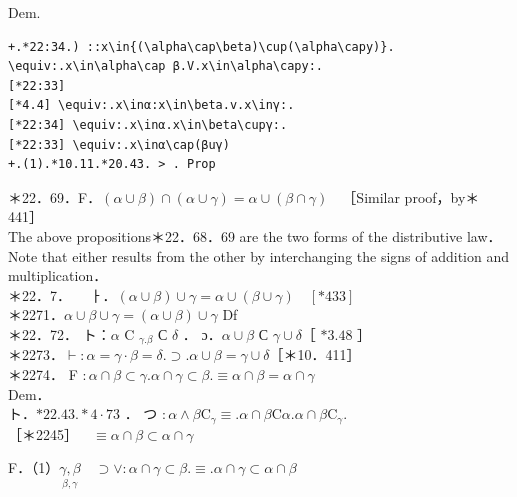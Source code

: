 \documentclass[10pt]{article}
\begin{document}
Dem.

\begin{verbatim}
+.*22:34.) ::x\in{(\alpha\cap\beta)\cup(\alpha\capy)}. \equiv:.x\in\alpha\cap β.V.x\in\alpha\capy:.
[*22:33]
[*4.4] \equiv:.x\inα:x\in\beta.v.x\inγ:.
[*22:34] \equiv:.x\inα.x\in\beta\cupγ:.
[*22:33] \equiv:.x\inα\cap(βuγ)
+.(1).*10.11.*20.43. > . Prop
\end{verbatim}

＊22．69．F．$(\alpha \cup \beta) \cap(\alpha \cup \gamma)=\alpha \cup(\beta \cap \gamma) \quad$［Similar proof，by＊441］\\
The above propositions＊22．68．69 are the two forms of the distributive law．Note that either results from the other by interchanging the signs of addition and multiplication．\\
＊22．7．$\quad$ ㅏ．$(\alpha \cup \beta) \cup \gamma=\alpha \cup(\beta \cup \gamma) \quad[* 433]$\\
＊2271．$\alpha \cup \beta \cup \gamma=(\alpha \cup \beta) \cup \gamma$ Df\\
＊22．72． ト：$\alpha$ C $_{\gamma . \beta}$ С $\delta$ ． ɔ．$\alpha \cup \beta$ С $\gamma \cup \delta$［ $* 3.48$ ］\\
＊2273．$\vdash: \alpha=\gamma \cdot \beta=\delta . \supset . \alpha \cup \beta=\gamma \cup \delta$［＊10．411］\\
＊2274． F $: \alpha \cap \beta \subset \gamma . \alpha \cap \gamma \subset \beta . \equiv \alpha \cap \beta=\alpha \cap \gamma$\\
Dem．\\
ト．$* 22.43 . * 4 \cdot 73$ ． つ $: \alpha \wedge \beta \mathrm{C}_{\gamma} \equiv . \alpha \cap \beta \mathrm{C} \alpha . \alpha \cap \beta \mathrm{C}_{\gamma}$.\\
［＊2245］$\quad \equiv \alpha \cap \beta \subset \alpha \cap \gamma$

F．（1）$\underset{\beta, \gamma}{\gamma, \beta} \quad \supset \vee: \alpha \cap \gamma \subset \beta . \equiv . \alpha \cap \gamma \subset \alpha \cap \beta$
\end{document}
